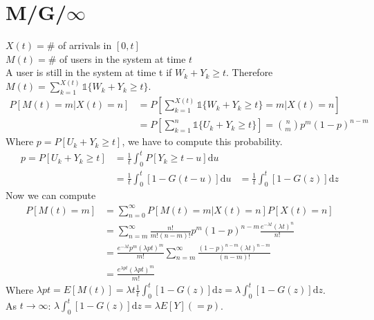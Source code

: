 \section{M/G/$\infty$}
$X(t)= \#$ of arrivals in $ [ 0, t ]$ \\
$M(t)= \#$ of users in the system at time $t$ \\
A user is still in the system at time t if $W_k + Y_k \geq t$. Therefore $M(t) = \sum\limits_{k=1}^{X(t)} \mathds{1}\{W_k + Y_k \geq t\} $.
\begin{equation}
  \begin{split}
      P[M(t)=m|X(t)=n] &= P[\sum\limits_{k=1}^{X(t)} \mathds{1}\{W_k + Y_k \geq t\} = m|X(t)=n] \\
      &= P[\sum\limits_{k=1}^{n} \mathds{1}\{U_k + Y_k \geq t\}] = {{n}\choose{m}}p^{m}(1-p)^{n-m}
  \end{split}
\end{equation}
Where $p = P[U_k + Y_k \geq t]$, we have to compute this probability.\\
\begin{equation}
  \begin{split}
    p = P[U_k + Y_k \geq t] &= \frac{1}{t}\int_0^t P[Y_k \geq t -u] \mathrm{d}u \\
    &= \frac{1}{t}\int_0^t [1 - G(t-u)] \mathrm{d}u
    &= \frac{1}{t}\int_0^t [1 - G(z)] \mathrm{d}z
  \end{split}
\end{equation}
Now we can compute
\begin{equation}
  \begin{split}
      P[M(t)=m] &= \sum\limits_{n=0}^{\infty} P[M(t)=m|X(t)=n]P[X(t)=n] \\
      &= \sum\limits_{n=m}^{\infty} \frac{n!}{m!(n-m)!}p^m(1-p)^{n-m}\frac{e^{-\lambda t} (\lambda t)^n}{n!} \\
      &= \frac{e^{-\lambda t} p^m (\lambda p t)^m}{m!}\sum\limits_{n=m}^{\infty} \frac{(1-p)^{n-m}(\lambda t)^{n-m}}{(n-m)!}\\
      &= \frac{e^{\lambda p t}(\lambda p t)^m}{m!}
  \end{split}
\end{equation}
Where $\lambda p t = E[M(t)] = \lambda t \frac{1}{t} \int_0^t [1 - G(z)] \mathrm{d}z = \lambda \int_0^t [1 - G(z)] \mathrm{d}z$. \\
As $t \rightarrow \infty$: $\lambda \int_0^t [1 - G(z)] \mathrm{d}z = \lambda E[Y] (=p)$.


